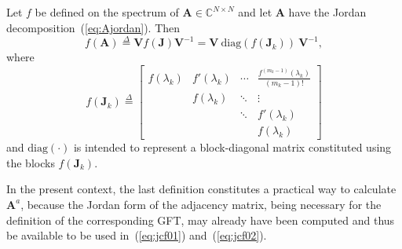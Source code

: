 \vspace{0.2cm}
\begin{definition}\label{def:jc01}
Let $f$ be defined on the spectrum of $\mathbf{A}\in\mathbb{C}^{N\times N}$ and let $\mathbf{A}$ have the Jordan decomposition~(\ref{eq:Ajordan}). Then
\begin{equation}\label{eq:jcf01}
f(\mathbf{A})\overset{\Delta}{=}\mathbf{V}f(\mathbf{J})\mathbf{V}^{-1}=\mathbf{V} \ \mathrm{diag}(f(\mathbf{J}_k)) \ \mathbf{V}^{-1},
\end{equation}
where
\begin{equation}\label{eq:jcf02}
f(\mathbf{J}_k)\overset{\Delta}{=}\left[\begin{array}{cccc}
f(\lambda_k) & f'(\lambda_k) & \cdots & \frac{f^{(m_k-1)}(\lambda_k)}{(m_k-1)!} \\
& f(\lambda_k)  & \ddots & \vdots                                  \\
&               & \ddots & f'(\lambda_k)                           \\
&               &        & f(\lambda_k)\end{array}\right]
\end{equation}
and $\mathrm{diag}(\cdot)$ is intended to represent a block-diagonal matrix constituted using the blocks $f(\mathbf{J}_k)$.
\end{definition}
In the present context, the last definition constitutes a practical way to calculate $\mathbf{A}^a$, because the Jordan form of the adjacency matrix, being necessary for the definition of the corresponding GFT, may already have been computed and thus be available to be used in~(\ref{eq:jcf01}) and~(\ref{eq:jcf02}).


